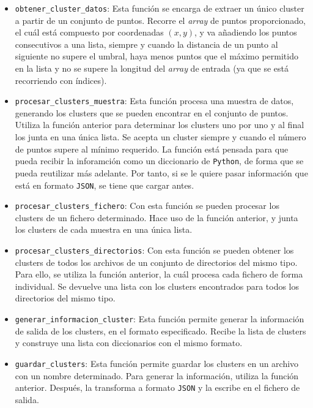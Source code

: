 \documentclass[11pt,a4paper]{article}
\begin{document}
\begin{itemize}[label=\textbullet]
	\item \texttt{obtener\_cluster\_datos}: Esta función se encarga de extraer un único
	cluster a partir de un conjunto de puntos. Recorre el \textit{array} de puntos
	proporcionado, el cuál está compuesto por coordenadas $(x, y)$, y va añadiendo
	los puntos consecutivos a una lista, siempre y cuando la distancia de un punto
	al siguiente no supere el umbral, haya menos puntos que el máximo permitido en la
	lista y no se supere la longitud del \textit{array} de entrada (ya que se está
	recorriendo con índices).
	\item \texttt{procesar\_clusters\_muestra}: Esta función procesa una muestra de datos,
	generando los clusters que se pueden encontrar en el conjunto de puntos. Utiliza la
	función anterior para determinar los clusters uno por uno y al final los
	junta en una única lista. Se acepta un cluster siempre y cuando el número de puntos
	supere al mínimo requerido. La función está pensada para que pueda recibir la inforamción
	como un diccionario de \texttt{Python}, de forma que se pueda reutilizar más adelante.
	Por tanto, si se le quiere pasar información que está en formato \texttt{JSON}, se tiene
	que cargar antes.
	\item \texttt{procesar\_clusters\_fichero}: Con esta función se pueden procesar
	los clusters de un fichero determinado. Hace uso de la función anterior, y junta
	los clusters de cada muestra en una única lista.
	\item \texttt{procesar\_clusters\_directorios}: Con esta función se pueden obtener
	los clusters de todos los archivos de un conjunto de directorios del mismo tipo.
	Para ello, se utiliza la función anterior, la cuál procesa cada fichero de forma
	individual. Se devuelve una lista con los clusters encontrados para todos los
	directorios del mismo tipo.
	\item \texttt{generar\_informacion\_cluster}: Esta función permite generar la información
	de salida de los clusters, en el formato especificado. Recibe la lista de clusters y construye
	una lista con diccionarios con el mismo formato.
	\item \texttt{guardar\_clusters}: Esta función permite guardar los clusters en un
	archivo con un nombre determinado. Para generar la información, utiliza la función
	anterior. Después, la transforma a formato \texttt{JSON} y la escribe en el fichero
	de salida.
\end{itemize}
\end{document}
